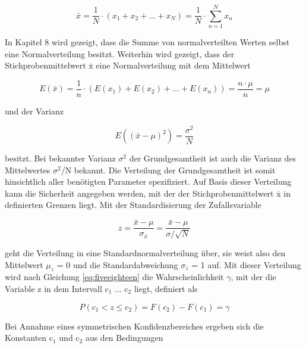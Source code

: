 \begin{equation}\label{eq:fivenineteen}
\bar{x}=\dfrac{1}{N} \cdot \left(x_{1} +x_{2} +...+x_{N} \right)=\dfrac{1}{N} \cdot \sum _{n=1}^{N}x_{n}
\end{equation}

\noindent In Kapitel 8 wird gezeigt, dass die Summe von normalverteilten Werten selbst eine Normalverteilung besitzt. Weiterhin wird gezeigt, dass der Stichprobenmittelwert $\overline{\mathrm{x}}$ eine Normalverteilung mit dem Mittelwert

\begin{equation}\label{eq:fivetwenty}
E\left(\bar{x}\right)=\dfrac{1}{n} \cdot \left(E\left(x_{1} \right)+E\left(x_{2} \right)+...+E\left(x_{n} \right)\right)=\dfrac{n\cdot \mu }{n} =\mu 
\end{equation}

\noindent und der Varianz

\begin{equation}\label{eq:fivetwentyone}
E\left(\left(\bar{x}-\mu \right)^{2} \right)=\dfrac{\sigma ^{2} }{N}
\end{equation}

\noindent besitzt. Bei bekannter Varianz $\sigma^{2}$ der Grundgesamtheit ist auch die Varianz des Mittelwertes $\sigma^{2}$/N bekannt. Die Verteilung der Grundgesamtheit ist somit hinsichtlich aller ben\"{o}tigten Parameter spezifiziert. Auf Basis dieser Verteilung kann die Sicherheit angegeben werden, mit der der Stichprobenmittelwert $\overline{\mathrm{x}}$ in definierten Grenzen liegt. Mit der Standardisierung der Zufallsvariable

\begin{equation}\label{eq:fivetwentytwo}
z=\dfrac{\bar{x}-\mu }{\sigma _{\bar{x}} } =\dfrac{\bar{x}-\mu }{\sigma /\sqrt{N} }
\end{equation}

\noindent geht die Verteilung in eine Standardnormalverteilung \"{u}ber, sie weist also den Mittelwert $\mu_{z}$ = 0 und die Standardabweichung $\sigma_{z}$ = 1 auf. Mit dieser Verteilung wird nach Gleichung \eqref{eq:fiveeighteen} die Wahrscheinlichkeit $\gamma$, mit der die Variable z in dem Intervall c$_{1}$ ... c$_{2}$ liegt, definiert als

\begin{equation}\label{eq:fivetwentythree}
P\left(c_{1} <z\le c_{2} \right)=F\left(c_{2} \right)-F\left(c_{1} \right)=\gamma
\end{equation}

\noindent Bei Annahme eines symmetrischen Konfidenzbereiches ergeben sich die Konstanten c$_{1}$ und c$_{2}$ aus den Bedingungen

